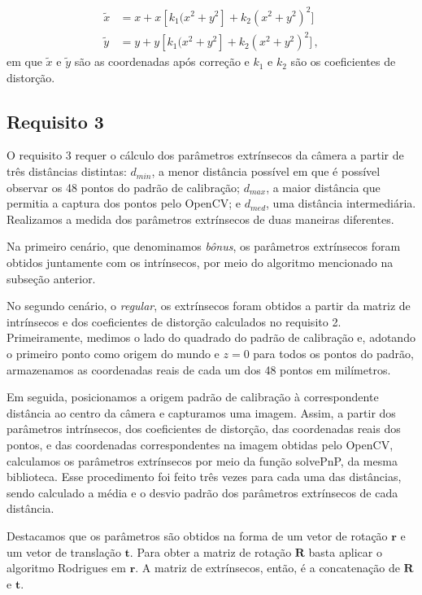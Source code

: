 \documentclass{bmvc2k}
\begin{document}
\begin{subequations}
    \begin{align}
    \widetilde{x}&=x+x[k_1(x^2+y^2] + k_2(x^2+y^2)^2] \\
    \widetilde{y}&=y+y[k_1(x^2+y^2] + k_2(x^2+y^2)^2]\,,
    \end{align}
\end{subequations}
em que $\widetilde{x}$ e $\widetilde{y}$ são as coordenadas após correção e $k_1$ e $k_2$ são os coeficientes de distorção.

\subsection{Requisito 3}
\label{met3}
O requisito 3 requer o cálculo dos parâmetros extrínsecos da câmera a partir de três distâncias distintas: $d_{min}$, a menor distância possível em que é possível observar os 48 pontos do padrão de calibração; $d_{max}$, a maior distância que permitia a captura dos pontos pelo OpenCV; e $d_{med}$, uma distância intermediária. Realizamos a medida dos parâmetros extrínsecos de duas maneiras diferentes.

Na primeiro cenário, que denominamos \textit{bônus}, os parâmetros extrínsecos foram obtidos juntamente com os intrínsecos, por meio do algoritmo mencionado na subseção anterior.

No segundo cenário, o \textit{regular}, os extrínsecos foram obtidos a partir da matriz de intrínsecos e dos coeficientes de distorção calculados no requisito 2. Primeiramente, medimos o lado do quadrado do padrão de calibração e, adotando o primeiro ponto como origem do mundo e  $z=0$ para todos os pontos do padrão, armazenamos as coordenadas reais de cada um dos 48 pontos em milímetros. 

Em seguida, posicionamos a origem padrão de calibração à correspondente distância ao centro da câmera e capturamos uma imagem. Assim, a partir dos parâmetros intrínsecos, dos coeficientes de distorção, das coordenadas reais dos pontos, e das coordenadas correspondentes na imagem obtidas pelo OpenCV, calculamos os parâmetros extrínsecos por meio da função solvePnP, da mesma  biblioteca. Esse procedimento foi feito três vezes para cada uma das distâncias, sendo calculado a média e o desvio padrão dos parâmetros extrínsecos de cada distância.

Destacamos que os parâmetros são obtidos na forma de um vetor de rotação $\bm{r}$  e um vetor de translação $\bm{t}$. Para obter a matriz de rotação $\mathbf{R}$ basta aplicar o algoritmo Rodrigues em $\bm{r}$. A matriz de extrínsecos, então, é a concatenação de $\mathbf{R}$ e $\bm{t}$.
\end{document}
